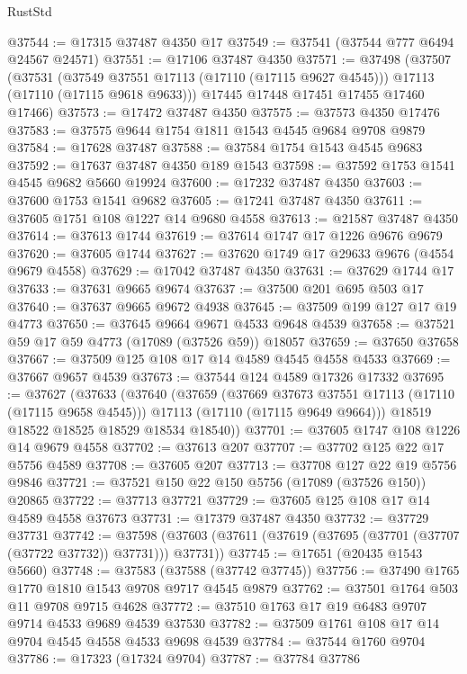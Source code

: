 \begin{lexlean}{RustStd}
\begin{coremodule}
@37544 := @17315 @37487 @4350 @17
@37549 := @37541 (@37544 @777 @6494 @24567 @24571)
@37551 := @17106 @37487 @4350
@37571 := @37498
    (@37507
      (@37531
        (@37549 @37551 @17113 (@17110 (@17115 @9627 @4545)))
        @17113
        (@17110 (@17115 @9618 @9633)))
      @17445
      @17448
      @17451
      @17455
      @17460
      @17466)
@37573 := @17472 @37487 @4350
@37575 := @37573 @4350 @17476
@37583 := @37575 @9644 @1754 @1811 @1543 @4545 @9684 @9708 @9879
@37584 := @17628 @37487
@37588 := @37584 @1754 @1543 @4545 @9683
@37592 := @17637 @37487 @4350 @189 @1543
@37598 := @37592 @1753 @1541 @4545 @9682 @5660 @19924
@37600 := @17232 @37487 @4350
@37603 := @37600 @1753 @1541 @9682
@37605 := @17241 @37487 @4350
@37611 := @37605 @1751 @108 @1227 @14 @9680 @4558
@37613 := @21587 @37487 @4350
@37614 := @37613 @1744
@37619 := @37614 @1747 @17 @1226 @9676 @9679
@37620 := @37605 @1744
@37627 := @37620 @1749 @17 @29633 @9676 (@4554 @9679 @4558)
@37629 := @17042 @37487 @4350
@37631 := @37629 @1744 @17
@37633 := @37631 @9665 @9674
@37637 := @37500 @201 @695 @503 @17
@37640 := @37637 @9665 @9672 @4938
@37645 := @37509 @199 @127 @17 @19 @4773
@37650 := @37645 @9664 @9671 @4533 @9648 @4539
@37658 := @37521 @59 @17 @59 @4773 (@17089 (@37526 @59)) @18057
@37659 := @37650 @37658
@37667 := @37509 @125 @108 @17 @14 @4589 @4545 @4558 @4533
@37669 := @37667 @9657 @4539
@37673 := @37544 @124 @4589 @17326 @17332
@37695 := @37627
    (@37633
      (@37640
        (@37659
          (@37669 @37673 @37551 @17113 (@17110 (@17115 @9658 @4545)))
          @17113
          (@17110 (@17115 @9649 @9664)))
        @18519
        @18522
        @18525
        @18529
        @18534
        @18540))
@37701 := @37605 @1747 @108 @1226 @14 @9679 @4558
@37702 := @37613 @207
@37707 := @37702 @125 @22 @17 @5756 @4589
@37708 := @37605 @207
@37713 := @37708 @127 @22 @19 @5756 @9846
@37721 := @37521 @150 @22 @150 @5756 (@17089 (@37526 @150)) @20865
@37722 := @37713 @37721
@37729 := @37605 @125 @108 @17 @14 @4589 @4558 @37673
@37731 := @17379 @37487 @4350
@37732 := @37729 @37731
@37742 := @37598 (@37603 (@37611 (@37619 (@37695 (@37701 (@37707 (@37722 @37732)) @37731))) @37731))
@37745 := @17651 (@20435 @1543 @5660)
@37748 := @37583 (@37588 (@37742 @37745))
@37756 := @37490 @1765 @1770 @1810 @1543 @9708 @9717 @4545 @9879
@37762 := @37501 @1764 @503 @11 @9708 @9715 @4628
@37772 := @37510 @1763 @17 @19 @6483 @9707 @9714 @4533 @9689 @4539 @37530
@37782 := @37509 @1761 @108 @17 @14 @9704 @4545 @4558 @4533 @9698 @4539
@37784 := @37544 @1760 @9704
@37786 := @17323 (@17324 @9704)
@37787 := @37784 @37786

\end{coremodule}
\end{lexlean}
